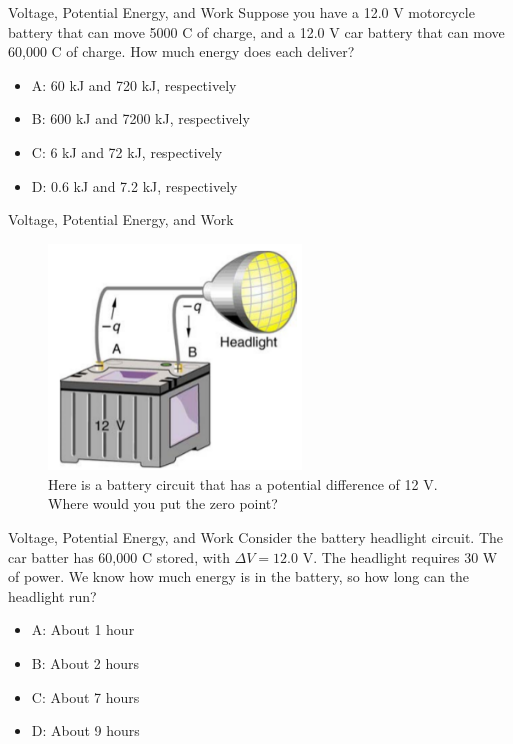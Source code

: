 \documentclass{beamer}
\begin{document}
\begin{frame}{Voltage, Potential Energy, and Work}
Suppose you have a 12.0 V motorcycle battery that can move 5000 C of charge, and a 12.0 V car battery that can move 60,000 C of charge. How much energy does each deliver?
\begin{itemize}
\item A: 60 kJ and 720 kJ, respectively
\item B: 600 kJ and 7200 kJ, respectively
\item C: 6 kJ and 72 kJ, respectively
\item D: 0.6 kJ and 7.2 kJ, respectively
\end{itemize}
\end{frame}

\begin{frame}{Voltage, Potential Energy, and Work}
\begin{figure}
\centering
\includegraphics[width=0.6\textwidth]{figures/headlight.png}
\caption{\label{fig:headlight.png} Here is a battery circuit that has a potential difference of 12 V.  Where would you put the zero point?}
\end{figure}
\end{frame}

\begin{frame}{Voltage, Potential Energy, and Work}
Consider the battery headlight circuit.  The car batter has 60,000 C stored, with $\Delta V = 12.0$ V.  The headlight requires 30 W of power.  We know how much energy is in the battery, so how long can the headlight run?
\begin{itemize}
\item A: About 1 hour
\item B: About 2 hours
\item C: About 7 hours
\item D: About 9 hours
\end{itemize}
\end{frame}
\end{document}
